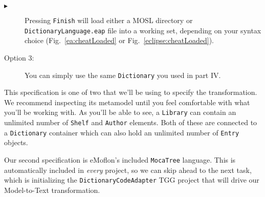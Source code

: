 \begin{description}
\item[$\blacktriangleright$] Pressing \texttt{Finish} will load either a MOSL directory or \texttt{DictionaryLanguage.eap} file into a working set, depending on
your syntax choice (Fig.~\ref{ea:cheatLoaded} or Fig.~\ref{eclipse:cheatLoaded}).

\begin{figure}[htbp]
   \centering
      \caption{}
\end{figure}


\clearpage
\item[Option 3:] You can simply use the same \texttt{Dictionary} you used in part IV.

\end{description} 

\vspace{0.5cm}

This specification is one of two that we'll be using to specify the transformation. We recommend inspecting its metamodel until you feel comfortable with
what you'll be working with. As you'll be able to see, a \texttt{Library} can contain an unlimited number of \texttt{Shelf} and \texttt{Author} elements. Both
of these are connected to a \texttt{Dictionary} container which can also hold an unlimited number of \texttt{Entry} objects.

Our second specification is eMoflon's included \texttt{MocaTree} language. This is automatically included in \emph{every} project, so we can skip ahead to the
next task, which is initializing the \texttt{DictionaryCodeAdapter} TGG project that will drive our Model-to-Text transformation.







